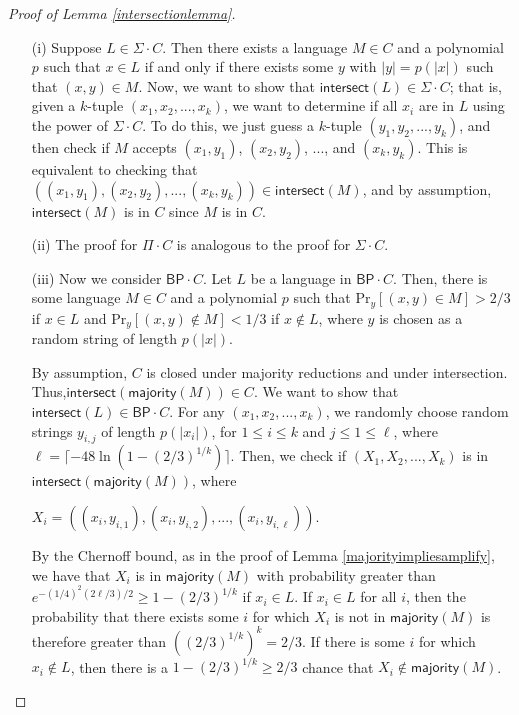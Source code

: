 \documentclass[11pt]{article}
\newcommand{\pr}{\text{Pr}}
\newcommand{\bp}{\textsf{BP}}
\newcommand{\strongbp}{\widehat{\textsf{BP}}}
\newcommand{\intersect}{\textsf{intersect}}
\newcommand{\majority}{\textsf{majority}}
\begin{document}
\begin{proof}[Proof of Lemma \ref{intersectionlemma}]
\begin{enumerate}
\item[]
\item[(i)] Suppose $L \in \Sigma\cdot C$. Then there exists a language $M\in C$ and a polynomial $p$ such that $x \in L$ if and only if there exists some $y$ with $|y| = p(|x|)$ such that $(x, y)\in M$. Now, we want to show that $\intersect(L) \in \Sigma \cdot C$; that is, given a $k$-tuple $(x_1,x_2,...,x_k)$, we want to determine if all $x_i$ are in $L$ using the power of $\Sigma \cdot C$. To do this, we just guess a $k$-tuple $(y_1,y_2,...,y_k)$, and then check if $M$ accepts $(x_1, y_1)$, $(x_2, y_2)$, ..., and $(x_k, y_k)$. This is equivalent to checking that $((x_1,y_1),(x_2,y_2),...,(x_k,y_k)) \in \intersect(M)$, and by assumption, $\intersect(M)$ is in $C$ since $M$ is in $C$.

\item[(ii)] The proof for $\Pi \cdot C$ is analogous to the proof for $\Sigma \cdot C$.


\item[(iii)] Now we consider $\bp \cdot C$. Let $L$ be a language in $\bp \cdot C$. Then, there is some language $M \in C$ and a polynomial $p$ such that $\pr_y[(x,y) \in M] > 2/3$ if $x\in L$ and $\pr_y[(x,y) \not \in M] < 1/3$ if $x\not\in L$, where $y$ is chosen as a random string of length $p(|x|)$.

By assumption, $C$ is closed under majority reductions and under intersection. Thus,\linebreak $\intersect(\majority(M)) \in C$. We want to show that $\intersect(L) \in \bp\cdot C$. For any $(x_1,x_2,...,x_k)$, we randomly choose random strings $y_{i,j}$ of length $p(|x_i|)$, for $1\le i\le k$ and $j\le 1\le \ell$, where $\ell = \lceil -48\ln(1 - (2/3)^{1/k}) \rceil$. Then, we check if $(X_1, X_2, ..., X_k)$
is in $\intersect(\majority(M))$, where
\begin{center}
$X_i = ((x_i,y_{i,1}),(x_{i},y_{i,2}),...,(x_{i},y_{i,\ell}))$.
\end{center}
By the Chernoff bound, as in the proof of Lemma \ref{majorityimpliesamplify}, we have that $X_i$ is in $\majority(M)$ with probability greater than $e^{-(1/4)^2 (2\ell/3)/2} \ge 1 - (2/3)^{1/k}$ if $x_i \in L$. If $x_i \in L$ for all $i$, then the probability that there exists some $i$ for which $X_i$ is not in $\majority(M)$ is therefore greater than $((2/3)^{1/k})^k = 2/3$. If there is some $i$ for which $x_i \not\in L$, then there is a $1 - (2/3)^{1/k} \ge 2/3$ chance that $X_i \not \in \majority(M)$.


\end{enumerate}
\end{proof}
\end{document}

